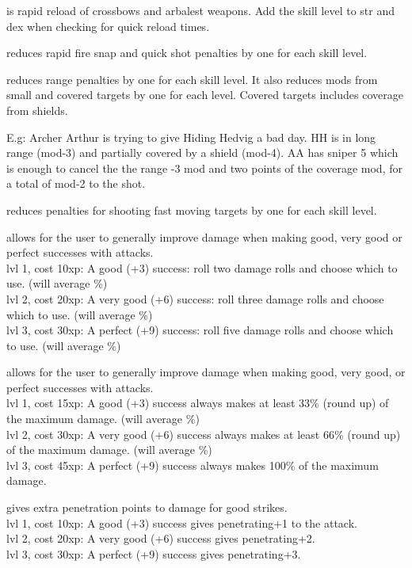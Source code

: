  is rapid reload of crossbows and arbalest weapons. Add the skill level to str and dex when checking for quick reload times.


 reduces rapid fire snap and quick shot penalties by one for each skill level.


 reduces range penalties by one for each skill level. It also reduces mods from small and covered targets by one for each level. Covered targets includes coverage from shields.

E.g: Archer Arthur is trying to give Hiding Hedvig a bad day. HH is in long range (mod-3) and partially covered by a shield (mod-4). AA has sniper 5 which is enough to cancel the the range -3 mod and two points of the coverage mod, for a total of mod-2 to the shot.


 reduces penalties for shooting fast moving targets by one for each skill level.


 allows for the user to generally improve damage when making good, very good or perfect successes with attacks. \\
lvl 1, cost 10xp: A good (+3) success: roll two damage rolls and choose which to use. (will average \%) \\
lvl 2, cost 20xp: A very good (+6) success: roll three damage rolls and choose which to use. (will average \%) \\
lvl 3, cost 30xp: A perfect (+9) success: roll five damage rolls and choose which to use. (will average \%)


 allows for the user to generally improve damage when making good, very good, or perfect successes with attacks. \\
lvl 1, cost 15xp: A good (+3) success always makes at least 33\% (round up) of the maximum damage. (will average \%) \\
lvl 2, cost 30xp: A very good (+6) success always makes at least 66\% (round up) of the maximum damage. (will average \%) \\
lvl 3, cost 45xp: A perfect (+9) success always makes 100\% of the maximum damage.


 gives extra penetration points to damage for good strikes. \\
lvl 1, cost 10xp: A good (+3) success gives penetrating+1 to the attack. \\
lvl 2, cost 20xp: A very good (+6) success gives penetrating+2. \\
lvl 3, cost 30xp: A perfect (+9) success gives penetrating+3.



